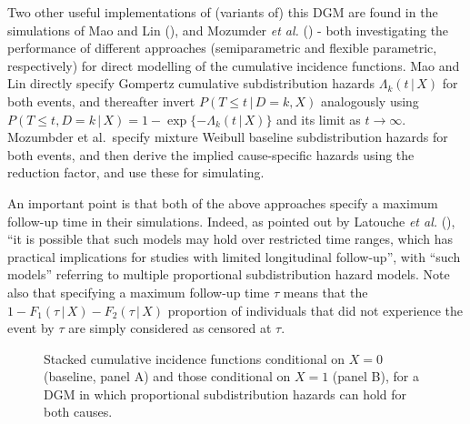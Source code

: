 \documentclass[
  letterpaper,
  DIV=11,
  numbers=noendperiod]{scrreprt}
\newcommand{\given}{\,|\,}
\begin{document}
Two other useful implementations of (variants of) this DGM are found in
the simulations of Mao and Lin
(), and
Mozumder \emph{et al.}
() - both
investigating the performance of different approaches (semiparametric
and flexible parametric, respectively) for direct modelling of the
cumulative incidence functions. Mao and Lin directly specify Gompertz
cumulative subdistribution hazards \(\Lambda_k(t \given X)\) for both
events, and thereafter invert \(P(T \leq t \given D=k, X)\) analogously
using \(P(T \leq t, D=k \given X) = 1 - \exp\{-\Lambda_k(t \given X)\}\)
and its limit as \(t \to \infty\). Mozumbder et al.~specify mixture
Weibull baseline subdistribution hazards for both events, and then
derive the implied cause-specific hazards using the reduction factor,
and use these for simulating.

An important point is that both of the above approaches specify a
maximum follow-up time in their simulations. Indeed, as pointed out by
Latouche \emph{et al.}
(), ``it is
possible that such models may hold over restricted time ranges, which
has practical implications for studies with limited longitudinal
follow-up'', with ``such models'' referring to multiple proportional
subdistribution hazard models. Note also that specifying a maximum
follow-up time \(\tau\) means that the
\(1 - F_1(\tau \given X) - F_2(\tau \given X)\) proportion of
individuals that did not experience the event by \(\tau\) are simply
considered as censored at \(\tau\).

\begin{figure}


\caption{\label{fig-twofgs}Stacked cumulative incidence functions
conditional on \(X = 0\) (baseline, panel A) and those conditional on
\(X = 1\) (panel B), for a DGM in which proportional subdistribution
hazards can hold for both causes.}

\end{figure}%
\end{document}
